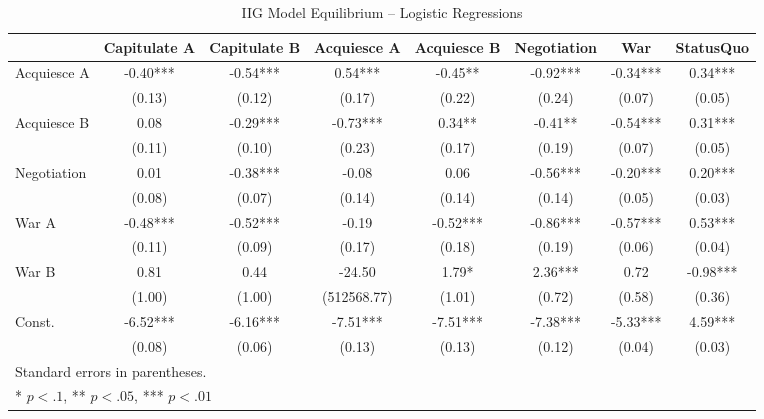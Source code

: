 \begin{landscape}
\begin{table}
	\begin{center}
		\caption{IIG Model Equilibrium -- Logistic Regressions}
		\label{table:eq_regressions}
	\begin{tabular}{lccccccc}
	\hline
	             & Capitulate A & Capitulate B & Acquiesce A & Acquiesce B & Negotiation & War      & StatusQuo   \\
	\hline
	Acquiesce A & -0.40***      & -0.54***     & 0.54***     & -0.45**     & -0.92***    & -0.34*** & 0.34***   \\
	            & (0.13)        & (0.12)       & (0.17)      & (0.22)      & (0.24)      & (0.07)   & (0.05)    \\
	Acquiesce B & 0.08          & -0.29***     & -0.73***    & 0.34**      & -0.41**     & -0.54*** & 0.31***   \\
	            & (0.11)        & (0.10)       & (0.23)      & (0.17)      & (0.19)      & (0.07)   & (0.05)    \\
	Negotiation & 0.01          & -0.38***     & -0.08       & 0.06        & -0.56***    & -0.20*** & 0.20***   \\
	            & (0.08)        & (0.07)       & (0.14)      & (0.14)      & (0.14)      & (0.05)   & (0.03)    \\
	War A       & -0.48***      & -0.52***     & -0.19       & -0.52***    & -0.86***    & -0.57*** & 0.53***   \\
	            & (0.11)        & (0.09)       & (0.17)      & (0.18)      & (0.19)      & (0.06)   & (0.04)    \\
	War B       & 0.81          & 0.44         & -24.50      & 1.79*       & 2.36***     & 0.72     & -0.98***  \\
	            & (1.00)        & (1.00)       & (512568.77) & (1.01)      & (0.72)      & (0.58)   & (0.36)    \\
	Const.      & -6.52***      & -6.16***     & -7.51***    & -7.51***    & -7.38***    & -5.33*** & 4.59***   \\
	            & (0.08)        & (0.06)       & (0.13)      & (0.13)      & (0.12)      & (0.04)   & (0.03)    \\
	\hline
	\hline
	\multicolumn{8}{l}{Standard errors in parentheses.} \\
	\multicolumn{8}{l}{* $p<.1$, ** $p<.05$, *** $p<.01$} \\
	\end{tabular}
	\end{center}
	\tableSpace
\end{table}


\end{landscape}
